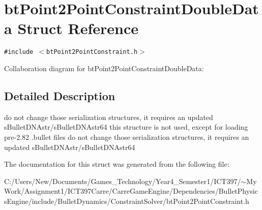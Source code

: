 \hypertarget{structbt_point2_point_constraint_double_data}{
\section{btPoint2PointConstraintDoubleData Struct Reference}
\label{structbt_point2_point_constraint_double_data}
}
{\tt \#include $<$btPoint2PointConstraint.h$>$}

Collaboration diagram for btPoint2PointConstraintDoubleData:

\subsection{Detailed Description}
do not change those serialization structures, it requires an updated sBulletDNAstr/sBulletDNAstr64 this structure is not used, except for loading pre-2.82 .bullet files do not change those serialization structures, it requires an updated sBulletDNAstr/sBulletDNAstr64 

The documentation for this struct was generated from the following file:\begin{CompactItemize}
\item 
C:/Users/New/Documents/Games\_\-Technology/Year4\_\-Semester1/ICT397/$\sim$My Work/Assignment1/ICT397Carre/CarreGameEngine/Dependencies/BulletPhysicsEngine/include/BulletDynamics/ConstraintSolver/btPoint2PointConstraint.h\end{CompactItemize}
